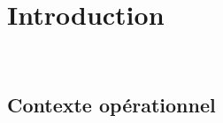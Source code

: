 \chapter*{Introduction}
\label{introduction}
\noindent \hrulefill \\

\section*{\label{contexte} Contexte opérationnel}

